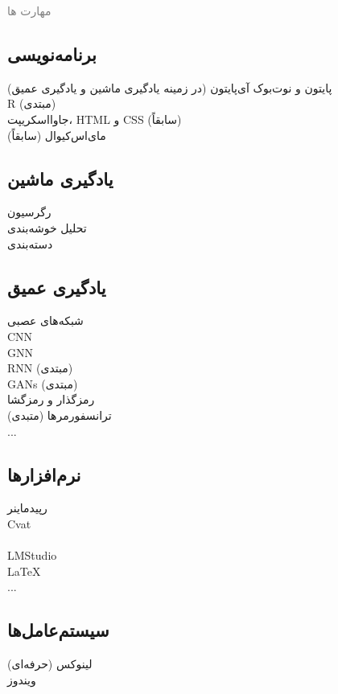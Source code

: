 \documentclass[a4paper]{deedy-persian} %
\begin{document}
\begin{minipage}[t]{0.33\textwidth} %
\textcolor{gray}{\huge{مهارت ها}}
\vspace{\itemsep}
\subsection*{برنامه‌نویسی}
پایتون و نوت‌بوک آی‌پایتون (در زمینه یادگیری ماشین و یادگیری عمیق) \\
R (مبتدی) \\
  جاوااسکریپت، HTML و CSS  (سابقاً) \\
مای‌اس‌کیوال (سابقاً) \\


\subsection{یادگیری ماشین}
رگرسیون \\
تحلیل خوشه‌بندی \\
دسته‌بندی\\
\sectionspace %

\subsection{یادگیری عمیق}
شبکه‌های عصبی \\
CNN \\
GNN \\
RNN (مبتدی) \\
GANs (مبتدی) \\ 
 رمزگذار و رمزگشا \\
 ترانسفورمرها (متبدی)\\
... \\

\sectionspace %

\subsection{نرم‌افزارها}
رپیدماینر \\
Cvat \\
 \\
LMStudio \\
\LaTeX \\
... \\

\subsection{سیستم‌عامل‌ها}
لینوکس (حرفه‌ای) \\
ویندوز \\


\end{minipage}
\end{document}
